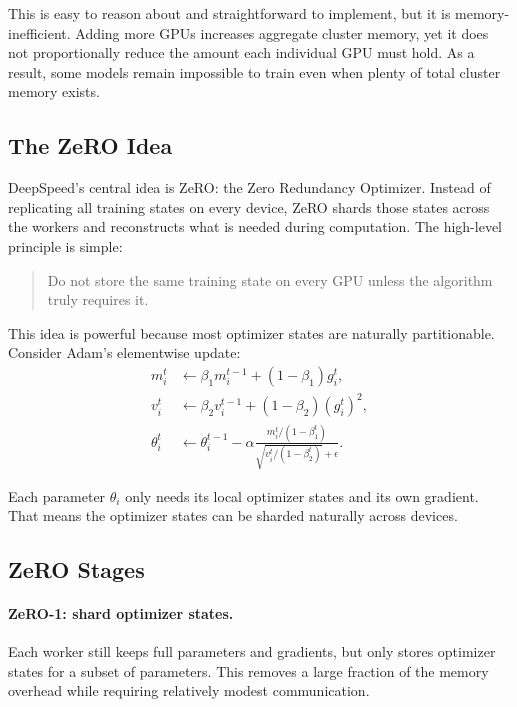 \documentclass[class=article,crop=false]{standalone}
\begin{document}
This is easy to reason about and straightforward to implement, but it is memory-inefficient. Adding more GPUs increases aggregate cluster memory, yet it does not proportionally reduce the amount each individual GPU must hold. As a result, some models remain impossible to train even when plenty of total cluster memory exists.

\subsection{The ZeRO Idea}
\label{sec:deepspeed:zero}

DeepSpeed's central idea is ZeRO: the Zero Redundancy Optimizer. Instead of replicating all training states on every device, ZeRO shards those states across the workers and reconstructs what is needed during computation. The high-level principle is simple:
\begin{quote}
Do not store the same training state on every GPU unless the algorithm truly requires it.
\end{quote}

This idea is powerful because most optimizer states are naturally partitionable. Consider Adam's elementwise update:
\begin{align}
  m_i^t &\leftarrow \beta_1 m_i^{t-1} + (1 - \beta_1) g_i^t, \\
  v_i^t &\leftarrow \beta_2 v_i^{t-1} + (1 - \beta_2) (g_i^t)^2, \\
  \theta_i^t &\leftarrow \theta_i^{t-1}
  - \alpha \frac{m_i^t / (1 - \beta_1^t)}
  {\sqrt{v_i^t / (1 - \beta_2^t)} + \epsilon}.
\end{align}

Each parameter $\theta_i$ only needs its local optimizer states and its own gradient. That means the optimizer states can be sharded naturally across devices.

\subsection{ZeRO Stages}
\label{sec:deepspeed:stages}

\paragraph{ZeRO-1: shard optimizer states.}
Each worker still keeps full parameters and gradients, but only stores optimizer states for a subset of parameters. This removes a large fraction of the memory overhead while requiring relatively modest communication.
\end{document}
